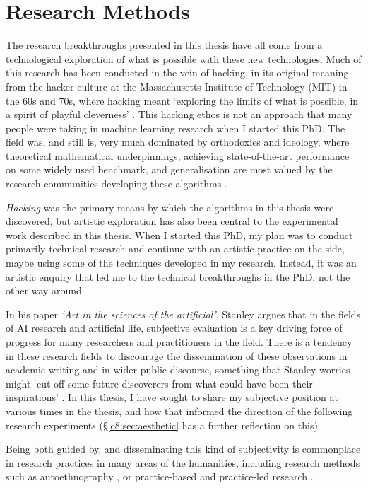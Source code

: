 \section{Research Methods}

The research breakthroughs presented in this thesis have all come from a technological exploration of what is possible with these new technologies. Much of this research has been conducted in the vein of hacking, in its original meaning from the hacker culture at the Massachusetts Institute of Technology (MIT) in the 60s and 70s, where hacking meant `exploring the limits of what is possible, in a spirit of playful cleverness' \citep{stallman2002hacking}. 
This hacking ethos is not an approach that many people were taking in machine learning research when I started this PhD. 
The field was, and still is, very much dominated by orthodoxies and ideology, where theoretical mathematical underpinnings, achieving state-of-the-art performance on some widely used benchmark, and generalisation are most valued by the research communities developing these algorithms \citep{birhane2022values}.

\textit{Hacking} was the primary means by which the algorithms in this thesis were discovered, but artistic exploration has also been central to the experimental work described in this thesis. 
When I started this PhD, my plan was to conduct primarily technical research and continue with an artistic practice on the side, maybe using some of the techniques developed in my research. 
Instead, it was an artistic enquiry that led me to the technical breakthroughs in the PhD, not the other way around. 

In his paper \textit{`Art in the sciences of the artificial'}, Stanley argues that in the fields of AI research and artificial life, subjective evaluation is a key driving force of progress for many researchers and practitioners in the field. 
There is a tendency in these research fields to discourage the dissemination of these observations in academic writing and in wider public discourse, something that Stanley worries might `cut off some future discoverers from what could have been their inspirations' \citep{stanley2018art}. 
In this thesis, I have sought to share my subjective position at various times in the thesis, and how that informed the direction of the following research experiments (\S \ref{c8:sec:aesthetic} has a further reflection on this).

Being both guided by, and disseminating this kind of subjectivity is commonplace in research practices in many areas of the humanities, including research methods such as autoethnography \citep{reed1997auto}, or practice-based and practice-led research \citep{candy2006practice}. 

